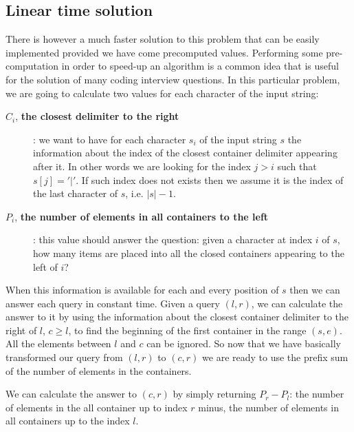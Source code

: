 \subsection{Linear time solution}
\label{items_in_containers_amazon:sec:lineartime}
There is however a much faster solution to this problem that can be easily implemented provided we
have come precomputed values. Performing some pre-computation in order to speed-up an algorithm is a
common idea that is useful for the solution of many coding interview questions. In this particular
problem, we are going to calculate two values for each character of the input string:
\begin{description}
	\item[$C_i$, \textbf{the closest delimiter to the right}]: we want to have for each character $s_i$ of
	the input string $s$ the information about the index of the closest container delimiter
	appearing after it. In other words we are looking for the index $j > i$ such that $s[j]='|'$. If
	such index does not exists then we assume it is the index of the last character of $s$, i.e.
	$|s|-1$.
	\item[$P_i$,  \textbf{the number of elements in all containers to the left}]: this value should answer
	the question: given a character at index $i$ of $s$, how many items are placed into all the
	closed containers appearing to the left of $i$? 
\end{description}
When this information is available for each and every position of $s$ then we can answer each query in constant time.
Given a query $(l,r)$, we can calculate the answer to it by using the information about 
the closest container delimiter to the right of $l$, $c\geq l$,
to find the beginning of the first container in the range $(s,e)$. All the elements 
between $l$ and $c$ can be ignored.
So now that we have basically transformed our query from $(l,r)$ to $(c,r)$ we are ready to use the prefix sum of the number of elements 
in the containers.

We can calculate the answer to $(c,r)$ by simply returning  $P_r - P_l$: the number of elements in the all container up to index $r$ minus, 
the number of elements in all containers up to the index $l$. 


